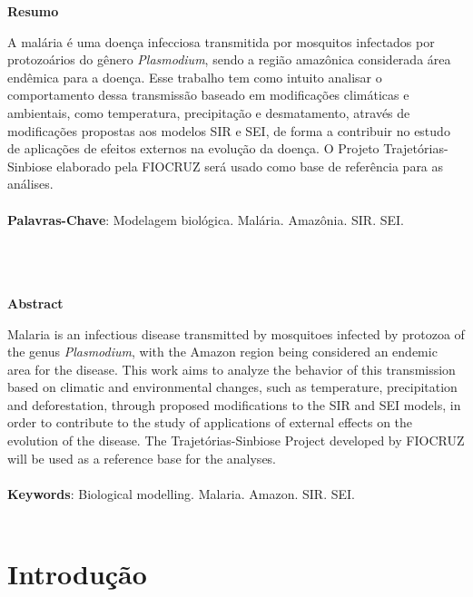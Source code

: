 \documentclass[12pt]{article}
\begin{document}
\newpage
\begin{center}
    \textbf{Resumo}
\end{center}

A malária é uma doença infecciosa transmitida por mosquitos infectados por protozoários do gênero \textit{Plasmodium}, sendo a região amazônica considerada área endêmica 
para a doença. Esse trabalho tem como intuito analisar o comportamento dessa transmissão baseado em modificações climáticas e ambientais, como temperatura, precipitação e desmatamento, 
através de modificações propostas aos modelos SIR e SEI, de forma a contribuir no estudo de aplicações 
de efeitos externos na evolução da doença. 
O Projeto Trajetórias-Sinbiose elaborado pela FIOCRUZ será usado como base de referência para as análises.
\\\\
\textbf{Palavras-Chave}: Modelagem biológica. Malária. Amazônia. SIR. SEI.
\\\\
\\\\
\begin{center}
    \textbf{Abstract}
\end{center}

Malaria is an infectious disease transmitted by mosquitoes infected by protozoa of the genus \textit{Plasmodium}, with the Amazon region being considered an endemic area 
for the disease. This work aims to analyze the behavior of this transmission based on climatic and environmental changes, such as temperature, precipitation and deforestation, through proposed 
modifications to the SIR and SEI models, in order to contribute to the study of applications
of external effects on the evolution of the disease. 
The Trajetórias-Sinbiose Project developed by FIOCRUZ will be used as a reference base for the analyses.
\\\\
\textbf{Keywords}: Biological modelling. Malaria. Amazon. SIR. SEI.
\\\\

\newpage
\tableofcontents
\thispagestyle{empty}

\newpage



\section{Introdução}
\end{document}
